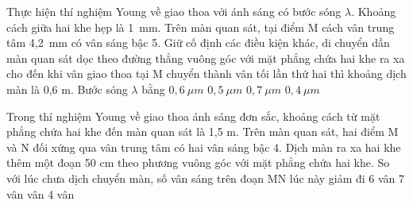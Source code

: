 \begin{vidu}%
 Thực hiện thí nghiệm Young về giao thoa với ánh sáng có bước sóng $\lambda$. Khoảng cách giữa hai khe hẹp là 1\ mm. Trên màn quan sát, tại điểm M cách vân trung tâm 4,2\ mm có vân sáng bậc 5. Giữ cố định các điều kiện khác, di chuyển dần màn quan sát dọc theo đường thẳng vuông góc với mặt phẳng chứa hai khe ra xa cho đến khi vân giao thoa tại M chuyển thành vân tối lần thứ hai thì khoảng dịch màn là 0,6 m. Bước sóng $\lambda$ bằng
\choice
{\True $0,6\ \mu m$}
{$0,5\ \mu m$}
{$0,7\ \mu m$}
{$0,4\ \mu m$}
\end{vidu} 
\begin{vidu}%
 Trong thí nghiệm Young về giao thoa ánh sáng đơn sắc, khoảng cách từ mặt phẳng chứa hai khe đến màn quan sát là 1,5 m. Trên màn quan sát, hai điểm M và N đối xứng qua vân trung tâm có hai vân sáng bậc 4. Dịch màn ra xa hai khe thêm một đoạn 50 cm theo phương vuông góc với mặt phẳng chứa hai khe. So với lúc chưa dịch chuyển màn, số vân sáng trên đoạn MN lúc này giảm đi
\choice
{6 vân}
{7 vân}
{ vân}
{4 vân}
\end{vidu} 
